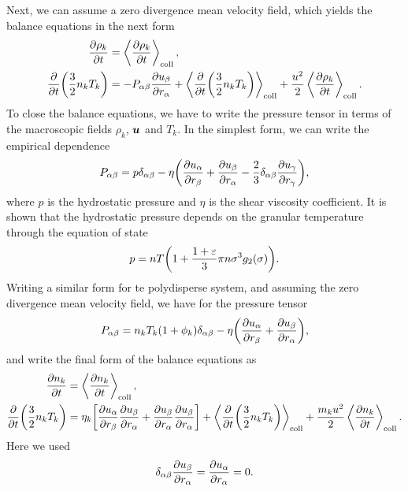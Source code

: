 \documentclass[aps,prl,preprint,groupedaddress,10pt]{revtex4-2}
\begin{document}
Next, we can assume a zero divergence mean velocity field, which yields the balance
equations in the next form
\begin{equation}
    \begin{split}
        \pdv{\rho_k}{t} &= \ltx{\avg{\pdv{\rho_k}{t}}}{coll},\\
        \pdv{t}\pqty{\frac{3}{2}n_kT_k} &= -\iab{P}\pdv{\ib{u}}{\ia{r}}+
        \ltx{\avg{\pdv{t}\pqty{\frac{3}{2}n_kT_k}}}{coll}+
        \frac{u^2}{2}\ltx{\avg{\pdv{\rho_k}{t}}}{coll}.
    \end{split}
\end{equation}
To close the balance equations, we have to write the pressure tensor in terms of the macroscopic
fields $\rho_k$, $\vb*{u}$ and $T_k$. In the simplest form, we can write the empirical dependence
\begin{equation}
    \iab{P} = p\iab{\delta}-\eta\pqty{\pdv{\ia{u}}{\ib{r}}+\pdv{\ib{u}}{\ia{r}}
        -\frac{2}{3}\iab{\delta}\pdv{\ig{u}}{\ig{r}}},
\end{equation}
where $p$ is the hydrostatic pressure and $\eta$ is the shear viscosity coefficient. It is shown
that the hydrostatic pressure depends on the granular temperature through the equation of state
\begin{equation}
    p = nT\pqty{1+\frac{1+\eps}{3}\pi n\sigma^{3}g_2\pqty{\sigma}}.
\end{equation}
Writing a similar form for te polydisperse system, and assuming the zero divergence mean velocity
field, we have for the pressure tensor
\begin{equation}
    \iab{P}=n_kT_k(1+\phi_k)\iab{\delta}-\eta\pqty{\pdv{\ia{u}}{\ib{r}}+\pdv{\ib{u}}{\ia{r}}},
\end{equation}
and write the final form of the balance equations as
\begin{equation}
    \begin{split}
        \pdv{n_k}{t} &= \ltx{\avg{\pdv{n_k}{t}}}{coll},\\
        \pdv{t}\pqty{\frac{3}{2}n_kT_k} &=
        \eta_k\bqty{\pdv{\ia{u}}{\ib{r}}\pdv{\ib{u}}{\ia{r}}+\pdv{\ib{u}}{\ia{r}}\pdv{\ib{u}}{\ia{r}}}+
        \ltx{\avg{\pdv{t}\pqty{\frac{3}{2}n_kT_k}}}{coll}+
        \frac{m_ku^2}{2}\ltx{\avg{\pdv{n_k}{t}}}{coll}.
    \end{split}
\end{equation}
Here we used
\begin{equation}
    {\delta}_{\alpha\beta}\pdv{{u}_{\beta}}{{r}_{\alpha}}=\pdv{{u}_{\alpha}}{{r}_{\alpha}}=0.
\end{equation}
\end{document}
